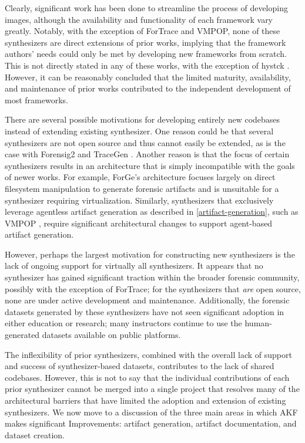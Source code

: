 Clearly, significant work has been done to streamline the process of
developing images, although the availability and functionality of each
framework vary greatly. Notably, with the exception of ForTrace and
VMPOP, none of these synthesizers are direct extensions of prior works,
implying that the framework authors' needs could only be met by
developing new frameworks from scratch. This is not directly stated in
any of these works, with the exception of hystck
\cite{gobelNovelApproachGenerating2020}. However, it can be
reasonably concluded that the limited maturity, availability, and
maintenance of prior works contributed to the independent development of
most frameworks.

There are several possible motivations for developing entirely new
codebases instead of extending existing synthesizer. One reason could be
that several synthesizers are not open source and thus cannot easily be
extended, as is the case with Forensig2
\cite{mochForensicImageGenerator2009} and TraceGen
\cite{duTraceGenUserActivity2021}. Another reason is that the focus
of certain synthesizers results in an architecture that is simply
incompatible with the goals of newer works. For example, ForGe's
architecture \cite{vistiAutomaticCreationComputer2015} focuses
largely on direct filesystem manipulation to generate forensic artifacts
and is unsuitable for a synthesizer requiring virtualization. Similarly,
synthesizers that exclusively leverage agentless artifact generation as
described in \autoref{artifact-generation}, such as VMPOP
\cite{parkTREDEVMPOPCultivating2018}, require significant
architectural changes to support agent-based artifact generation.

However, perhaps the largest motivation for constructing new
synthesizers is the lack of ongoing support for virtually all
synthesizers. It appears that no synthesizer has gained significant
traction within the broader forensic community, possibly with the
exception of ForTrace; for the synthesizers that \emph{are} open source,
none are under active development and maintenance. Additionally, the
forensic datasets generated by these synthesizers have not seen
significant adoption in either education or research; many instructors
continue to use the human-generated datasets available on public
platforms.

The inflexibility of prior synthesizers, combined with the overall lack
of support and success of synthesizer-based datasets, contributes to the
lack of shared codebases. However, this is not to say that the
individual contributions of each prior synthesizer cannot be merged into
a single project that resolves many of the architectural barriers that
have limited the adoption and extension of existing synthesizers. We now
move to a discussion of the three main areas in which AKF makes
significant Improvements: artifact generation, artifact documentation,
and dataset creation.

